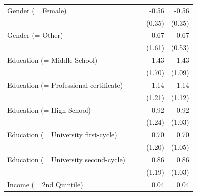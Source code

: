 \begin{table}[h!]
\begin{center}
\begin{footnotesize}
\begin{tabular}{l D{.}{.}{3.4} D{.}{.}{3.4} D{.}{.}{3.3} D{.}{.}{3.7}}
Gender (= Female)                      &                        &                         & -0.56                  & -0.56                   \\
                                       &                        &                         & (0.35)                 & (0.35)                  \\
Gender (= Other)                       &                        &                         & -0.67                  & -0.67                   \\
                                       &                        &                         & (1.61)                 & (0.53)                  \\
Education (= Middle School)            &                        &                         & 1.43                   & 1.43                    \\
                                       &                        &                         & (1.70)                 & (1.09)                  \\
Education (= Professional certificate) &                        &                         & 1.14                   & 1.14                    \\
                                       &                        &                         & (1.21)                 & (1.12)                  \\
Education (= High School)              &                        &                         & 0.92                   & 0.92                    \\
                                       &                        &                         & (1.24)                 & (1.03)                  \\
Education (= University first-cycle)   &                        &                         & 0.70                   & 0.70                    \\
                                       &                        &                         & (1.20)                 & (1.05)                  \\
Education (= University second-cycle)  &                        &                         & 0.86                   & 0.86                    \\
                                       &                        &                         & (1.19)                 & (1.03)                  \\
Income (= 2nd Quintile)                &                        &                         & 0.04                   & 0.04                    \\

\end{tabular}
\end{footnotesize}
\end{center}
\end{table}
